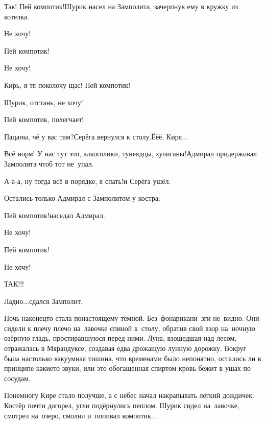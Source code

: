 \diagdash Так! Пей компотик!\mdash Шурик насел на Замполита, зачерпнув ему в кружку из котелка.

\diagdash Не хочу!

\diagdash Пей компотик!

\diagdash Не хочу!

\diagdash Кирь, я тя поколочу щас! Пей компотик!

\diagdash Шурик, отстань, не хочу!

\diagdash Пей компотик, полегчает!

\diagdash Пацаны, чё у вас там?\mdash Серёга вернулся к столу.\mdash Ё\sdash ё\sdash ё, Киря$\ldots$

\diagdash Всё норм! У нас тут это, алкоголики, тунеядцы, хулиганы!\mdash Адмирал придерживал Замполита чтоб тот не~упал.

\diagdash А-а-а, ну тогда всё в порядке, я спать!\mdash и Серёга ушёл.

Остались только Адмирал с Замполитом у костра: 

\diagdash Пей компотик!\mdash наседал Адмирал.

\diagdash Не хочу!

\diagdash Пей компотик!

\diagdash Не хочу!

\diagdash ТАК!!!

\diagdash Ладно$\ldots$\mdash сдался Замполит.

Ночь наконец\sdash то стала по\sdash настоящему тёмной. Без~фонарика\mdash ни~зги не~видно. Они сидели к плечу плечо на~лавочке спиной к~столу, обратив свой взор на~ночную озёрную гладь, простиравшуюся перед ними. Луна, взошедшая над лесом, отражалась в Мярандуксе, создавая едва дрожащую лунную дорожку. Вокруг была настолько вакуумная тишина, что временами было непонятно, остались ли в принципе какие\sdash то звуки, или это обогащенная спиртом кровь бежит в ушах по сосудам.


Понемногу Кире стало получше, а с небес начал накрапывать лёгкий дождичек. Костёр почти догорел, угли подёрнулись пеплом. Шурик сидел на~лавочке, смотрел на~озеро, смолил и~попивал компотик$\ldots$


\begin{center}
\end{center}
